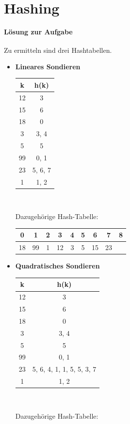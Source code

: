 \documentclass[11pt,a4paper]{scrartcl}
\begin{document}
\section{Hashing}
\paragraph{Lösung zur Aufgabe} \label{a7:lsg} Zu ermitteln sind drei Hashtabellen.
\begin{itemize}
\item \textbf{Lineares Sondieren}
\begin{center}
\begin{tabular}{|c|c|}
\hline
k & h(k) \\
\hline
12 & 3 \\
15 & 6 \\
18 & 0 \\
3 & 3, 4 \\
5 & 5 \\
99 & 0, 1 \\
23 & 5, 6, 7 \\
1 & 1, 2 \\
\hline
\end{tabular} \\
\end{center}
Dazugehörige Hash-Tabelle:
\begin{center}
\begin{tabular}{|c|c|c|c|c|c|c|c|c|}
\hline
0 & 1 & 2 & 3 & 4 & 5 & 6 & 7 & 8 \\
\hline
18 & 99 & 1 & 12 & 3 & 5 & 15 & 23 & \\
\hline
\end{tabular}
\end{center}
\item \textbf{Quadratisches Sondieren}
\begin{center}
\begin{tabular}{|c|c|}
\hline
k & h(k) \\
\hline
12 & 3 \\
15 & 6 \\
18 & 0 \\
3 & 3, 4 \\
5 & 5 \\
99 & 0, 1 \\
23 & 5, 6, 4, 1, 1, 5, 5, 3, 7 \\
1 & 1, 2 \\
\hline
\end{tabular} \\
\end{center}
Dazugehörige Hash-Tabelle:

\end{itemize}
\end{document}

